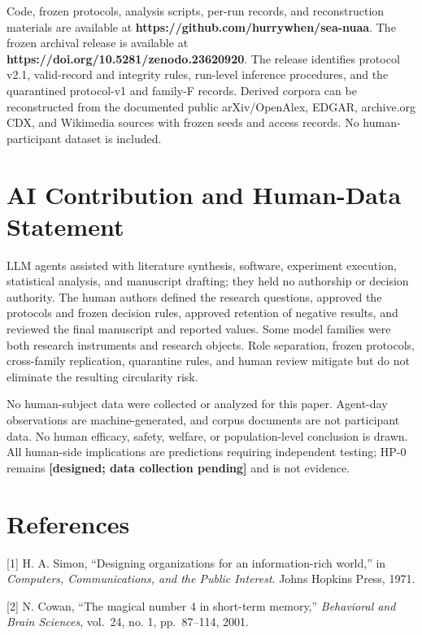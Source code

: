 \documentclass[
  conference,10pt]{IEEEtran}
\begin{document}
Code, frozen protocols, analysis scripts, per-run records, and reconstruction materials are available at \textbf{https://github.com/hurrywhen/sea-nuaa}. The frozen archival release is available at \textbf{https://doi.org/10.5281/zenodo.23620920}. The release identifies protocol v2.1, valid-record and integrity rules, run-level inference procedures, and the quarantined protocol-v1 and family-F records. Derived corpora can be reconstructed from the documented public arXiv/OpenAlex, EDGAR, archive.org CDX, and Wikimedia sources with frozen seeds and access records. No human-participant dataset is included.

\section{AI Contribution and Human-Data Statement}\label{ai-contribution-and-human-data-statement}

LLM agents assisted with literature synthesis, software, experiment execution, statistical analysis, and manuscript drafting; they held no authorship or decision authority. The human authors defined the research questions, approved the protocols and frozen decision rules, approved retention of negative results, and reviewed the final manuscript and reported values. Some model families were both research instruments and research objects. Role separation, frozen protocols, cross-family replication, quarantine rules, and human review mitigate but do not eliminate the resulting circularity risk.

No human-subject data were collected or analyzed for this paper. Agent-day observations are machine-generated, and corpus documents are not participant data. No human efficacy, safety, welfare, or population-level conclusion is drawn. All human-side implications are predictions requiring independent testing; HP-0 remains \textbf{{[}designed; data collection pending{]}} and is not evidence.

\section{References}\label{references}
\begingroup\footnotesize

{[}1{]} H. A. Simon, ``Designing organizations for an information-rich world,'' in \emph{Computers, Communications, and the Public Interest}. Johns Hopkins Press, 1971.

{[}2{]} N. Cowan, ``The magical number 4 in short-term memory,'' \emph{Behavioral and Brain Sciences}, vol.~24, no. 1, pp.~87--114, 2001.
\end{document}
